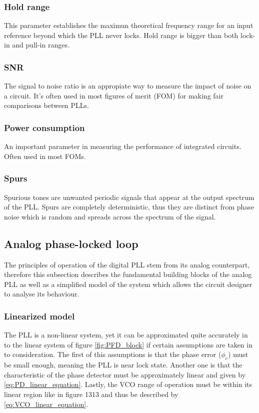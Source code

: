 \subsubsection{Hold range}
This parameter establishes the maximun theoretical frequency range for an input reference beyond which the PLL never locks. Hold range
is bigger than both lock-in and pull-in ranges.
\subsubsection{SNR}
The signal to noise ratio is an appropiate way to measure the impact of noise on a circuit. It's often used in most figures
of merit (FOM) for making fair comparisons between PLLs.
\subsubsection{Power consumption}
An important parameter in measuring the performance of integrated circuits. Often used in most FOMs.
\subsubsection{Spurs}
Spurious tones are unwanted periodic signals that appear at the output spectrum of the PLL. Spurs are completely deterministic, thus they are distinct
from phase noise which is random and spreads across the spectrum of the signal.

\subsection{Analog phase-locked loop}
The principles of operation of the digital PLL stem from its analog counterpart, therefore this subsection describes the fundamental 
building blocks of the analog PLL as well as a simplified model of the system which allows the circuit designer to analyse its behaviour.

\subsubsection{Linearized model}
The PLL is a non-linear system, yet it can be approximated quite accurately in to the linear system of figure \ref{fig:PFD_block} if certain
assumptions are taken in to consideration. The first of this assumptions is that the phase error ($\phi_{e}$) must be small enough, 
meaning the PLL is near lock state. Another one is that the characteristic of the phase detector must be approximately linear and given
by \eqref{eq:PD_linear_equation}. Lastly, the VCO range of operation must be within its linear region like in figure 1313 and thus be 
described by \eqref{eq:VCO_linear_equation}.

